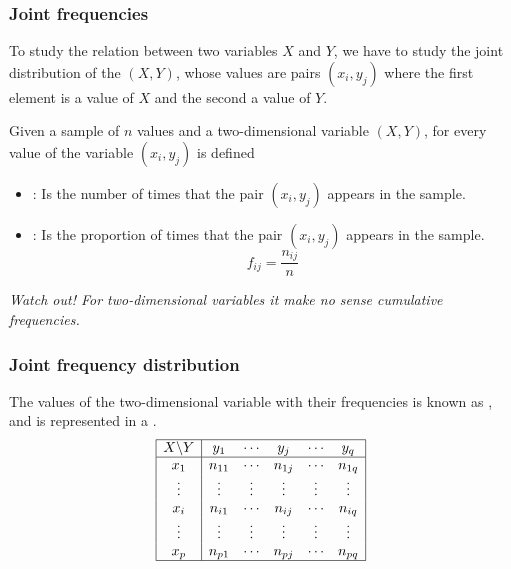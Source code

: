 \begin{frame}
\frametitle{Joint frequencies}
To study the relation between two variables $X$ and $Y$, we have to study the joint distribution of the  $(X,Y)$, whose values are pairs $(x_i,y_j)$ where the first element is a value of $X$ and the second a value of $Y$.

\begin{definition}
Given a sample of $n$ values and a two-dimensional variable $(X,Y)$, for every value of the variable $(x_i,y_j)$ is defined
\begin{itemize}
\item {}: Is the number of times that the pair $(x_i,y_j)$ appears in the sample.
\item {}: Is the proportion of times that the pair $(x_i,y_j)$ appears in the
sample.
\[
f_{ij}=\frac{n_{ij}}{n}
\]
\end{itemize}
\end{definition}

\begin{center}
\alert{\emph{Watch out! For two-dimensional variables it make no sense cumulative frequencies.}}
\end{center}
\end{frame}


\begin{frame}
\frametitle{Joint frequency distribution}
The values of the two-dimensional variable with their frequencies is known as , and is represented in a .
\[
\begin{array}{|c|ccccc|}
\hline
X\backslash Y & y_1 & \cdots & y_j & \cdots & y_q\\
\hline
x_1 & n_{11} & \cdots & n_{1j} & \cdots & n_{1q}\\
\vdots & \vdots & \vdots & \vdots & \vdots & \vdots\\
x_i & n_{i1} & \cdots & n_{ij} & \cdots & n_{iq}\\
\vdots & \vdots & \vdots & \vdots & \vdots & \vdots\\
x_p & n_{p1} & \cdots & n_{pj} & \cdots & n_{pq}\\
\hline
\end{array}
\]
\end{frame}


